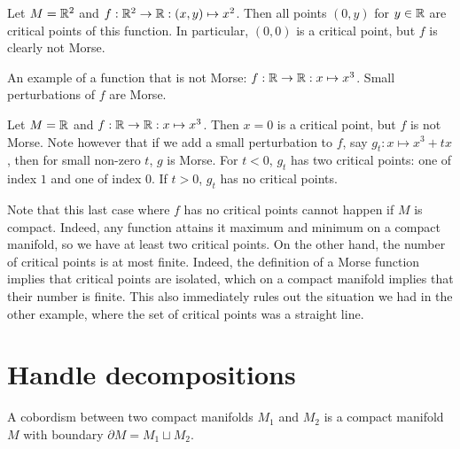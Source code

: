 \begin{eg}
    Let $M = \mathbb{R}^2$ and $f: \mathbb{R}^2 \to  \mathbb{R}: (x, y) \mapsto  x^2$.
    Then all points $(0, y)$ for  $y \in \mathbb{R}$ are critical points of this function.
    In particular, $(0, 0)$ is a critical point, but $f$ is clearly not Morse.
\end{eg}
\begin{marginfigure}
    \centering
    \caption{}
    \label{fig:non-example-of-morse-function}
\end{marginfigure}
\begin{marginfigure}
    \centering
    \caption{An example of a function that is not Morse: $f: \mathbb{R} \to  \mathbb{R}: x \mapsto  x^3$.
        Small perturbations of $f$ are Morse.
    }
    \label{fig:non-examples-of-morse-functions}
\end{marginfigure}
\begin{eg}
    Let $M = \mathbb{R}$ and $f : \mathbb{R} \to  \mathbb{R}: x \mapsto x^3$.
    Then $x = 0$ is a critical point, but $f$ is not Morse.
    Note however that if we add a small perturbation to $f$, say $g_t: x\mapsto x^3+ tx$, then for small non-zero $t$, $g$ is Morse. For $t < 0$, $g_t$  has two critical points: one of index $1$ and one of index $0$.
    If $t > 0$,  $g_t$ has no critical points.
\end{eg}

Note that this last case where $f$ has no critical points cannot happen if $M$ is compact.
Indeed, any function attains it maximum and minimum on a compact manifold, so we have at least two critical points.
On the other hand, the number of critical points is at most finite.
Indeed, the definition of a Morse function implies that critical points are isolated, which on a compact manifold implies that their number is finite.
This also immediately rules out the situation we had in the other example, where the set of critical points was a straight line.

\section{Handle decompositions}

\begin{definition}
A cobordism between two compact manifolds $M_1$ and $M_2$ is a compact manifold $M$  with boundary $\partial M = M_1 \sqcup M_2$.
\end{definition}


